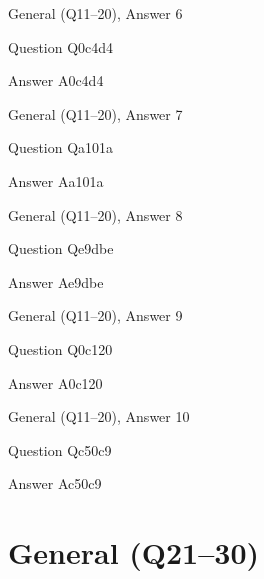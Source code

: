 \documentclass[11pt]{beamer}
\begin{document}
\begin{frame}[t]{General (Q11--20), Answer 6}
\vspace{2em}
\begin{block}{Question}
Q0c4d4
\end{block}
\pause{}
\begin{block}{Answer}
A0c4d4
\end{block}
\end{frame}
    

\begin{frame}[t]{General (Q11--20), Answer 7}
\vspace{2em}
\begin{block}{Question}
Qa101a
\end{block}
\pause{}
\begin{block}{Answer}
Aa101a
\end{block}
\end{frame}
    

\begin{frame}[t]{General (Q11--20), Answer 8}
\vspace{2em}
\begin{block}{Question}
Qe9dbe
\end{block}
\pause{}
\begin{block}{Answer}
Ae9dbe
\end{block}
\end{frame}
    

\begin{frame}[t]{General (Q11--20), Answer 9}
\vspace{2em}
\begin{block}{Question}
Q0c120
\end{block}
\pause{}
\begin{block}{Answer}
A0c120
\end{block}
\end{frame}
    

\begin{frame}[t]{General (Q11--20), Answer 10}
\vspace{2em}
\begin{block}{Question}
Qc50c9
\end{block}
\pause{}
\begin{block}{Answer}
Ac50c9
\end{block}
\end{frame}
    

\section{General (Q21--30)}
    
\end{document}
